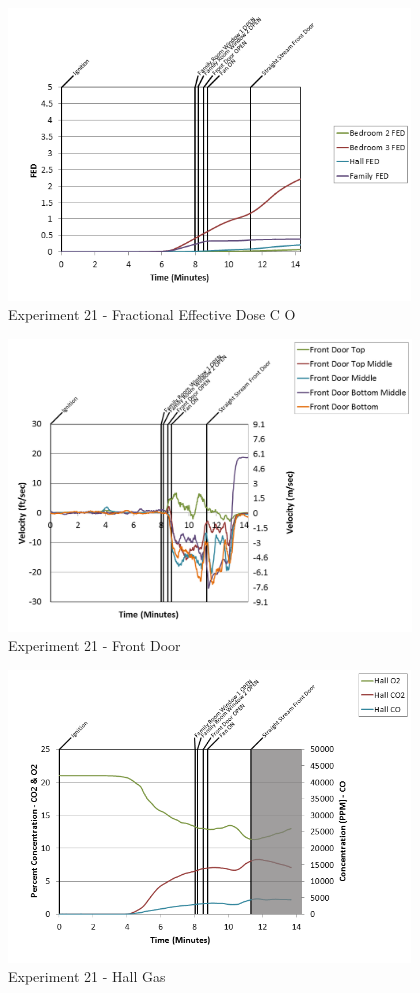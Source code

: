 \documentclass{article}
\begin{document}
\begin{appendices}
\clearpage

\begin{figure}[h!]
	\centering
	\includegraphics[height=3.05in]{0_Images/Results_Charts/Exp_21_Charts/FractionalEffectiveDoseCO.png}
	\caption{Experiment 21 - Fractional Effective Dose C O}
\end{figure}


\begin{figure}[h!]
	\centering
	\includegraphics[height=3.05in]{0_Images/Results_Charts/Exp_21_Charts/FrontDoor.png}
	\caption{Experiment 21 - Front Door}
\end{figure}

\clearpage

\begin{figure}[h!]
	\centering
	\includegraphics[height=3.05in]{0_Images/Results_Charts/Exp_21_Charts/HallGas.png}
	\caption{Experiment 21 - Hall Gas}
\end{figure}



\end{appendices}
\end{document}
